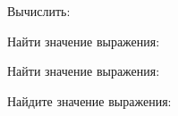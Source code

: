 \begin{enumcols}[label=\textbf{\arabic*.}]
	\item Вычислить:
	\begin{enumcols}[itemcolumns=2]
		\item {}
		\item {}
		\item {}
		\item {}
		\item {}
		\item {}
	\end{enumcols}
	\item Найти значение выражения:
	\begin{enumcols}[itemcolumns=2]
		\item {}
		\item {}
	\end{enumcols}
	\item {}
	\item {}
	\item {}
	\item {}
	\item {}
	\item {}
	\item Найти значение выражения:
	\begin{enumcols}[itemcolumns=2]
		\item {}
		\item {}
		\item {}
		\item {}
	\end{enumcols}
	\item Найдите значение выражения:
	\begin{enumcols}[itemcolumns=2]
		\item {}
		\item {}
		\item {}
		\item {}
	\end{enumcols}
	\item {}
	\item {}
	\item {}
	\item {}
\end{enumcols}